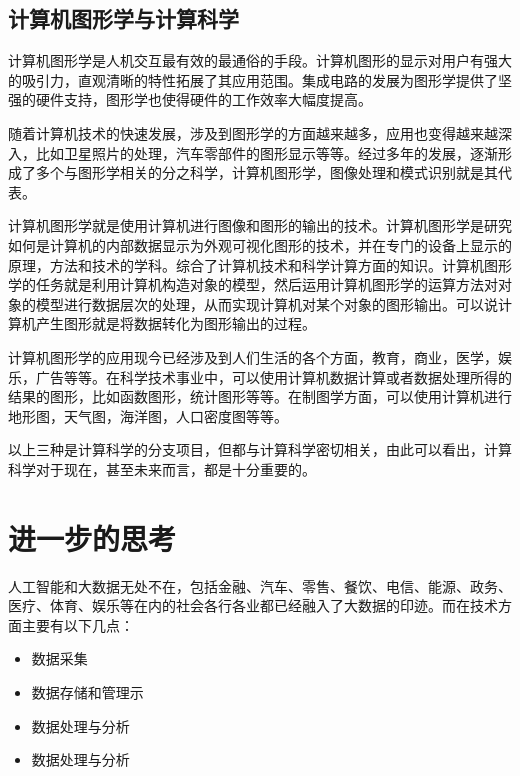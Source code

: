 \documentclass{article}
\begin{document}
\subsection{计算机图形学与计算科学}
\par 计算机图形学是人机交互最有效的最通俗的手段。计算机图形的显示对用户有强大的吸引力，直观清晰的特性拓展了其应用范围。集成电路的发展为图形学提供了坚强的硬件支持，图形学也使得硬件的工作效率大幅度提高。\par
随着计算机技术的快速发展，涉及到图形学的方面越来越多，应用也变得越来越深入，比如卫星照片的处理，汽车零部件的图形显示等等。经过多年的发展，逐渐形成了多个与图形学相关的分之科学，计算机图形学，图像处理和模式识别就是其代表。\par
计算机图形学就是使用计算机进行图像和图形的输出的技术。计算机图形学是研究如何是计算机的内部数据显示为外观可视化图形的技术，并在专门的设备上显示的原理，方法和技术的学科。综合了计算机技术和科学计算方面的知识。计算机图形学的任务就是利用计算机构造对象的模型，然后运用计算机图形学的运算方法对对象的模型进行数据层次的处理，从而实现计算机对某个对象的图形输出。可以说计算机产生图形就是将数据转化为图形输出的过程。\par
计算机图形学的应用现今已经涉及到人们生活的各个方面，教育，商业，医学，娱乐，广告等等。在科学技术事业中，可以使用计算机数据计算或者数据处理所得的结果的图形，比如函数图形，统计图形等等。在制图学方面，可以使用计算机进行地形图，天气图，海洋图，人口密度图等等。\par
以上三种是计算科学的分支项目，但都与计算科学密切相关，由此可以看出，计算科学对于现在，甚至未来而言，都是十分重要的。


\section{进一步的思考}
\par 人工智能和大数据无处不在，包括金融、汽车、零售、餐饮、电信、能源、政务、医疗、体育、娱乐等在内的社会各行各业都已经融入了大数据的印迹。而在技术方面主要有以下几点：

\begin{itemize}
	\item 数据采集 
	\item 数据存储和管理示
	\item 数据处理与分析
	\item 数据处理与分析
\end{itemize}
\end{document}
